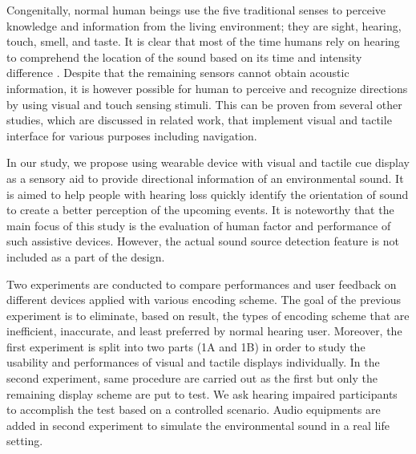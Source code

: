 \documentclass{sigchi}
\begin{document}
Congenitally, normal human beings use the five traditional senses to perceive knowledge and information from the living environment; they are sight, hearing, touch, smell, and taste. It is clear that most of the time humans rely on hearing to comprehend the location of the sound based on its time and intensity difference \cite{Wallach1939}. Despite that the remaining sensors cannot obtain acoustic information, it is however possible for human to perceive and recognize directions by using visual and touch sensing stimuli. This can be proven from several other studies, which are discussed in related work, that implement visual and tactile interface for various purposes including navigation.

In our study, we propose using wearable device with visual and tactile cue display as a sensory aid to provide directional information of an environmental sound. It is aimed to help people with hearing loss quickly identify the orientation of sound to create a better perception of the upcoming events. It is noteworthy that the main focus of this study is the evaluation of human factor and performance of such assistive devices. However, the actual sound source detection feature is not included as a part of the design.

Two experiments are conducted to compare performances and user feedback on different devices applied with various encoding scheme. The goal of the previous experiment is to eliminate, based on result, the types of encoding scheme that are inefficient, inaccurate, and least preferred by normal hearing user. Moreover, the first experiment is split into two parts (1A and 1B) in order to study the usability and performances of visual and tactile displays individually. In the second experiment, same procedure are carried out as the first but only the remaining display scheme are put to test. We ask hearing impaired participants to accomplish the test based on a controlled scenario. Audio equipments are added in second experiment to simulate the environmental sound in a real life setting.
\end{document}
